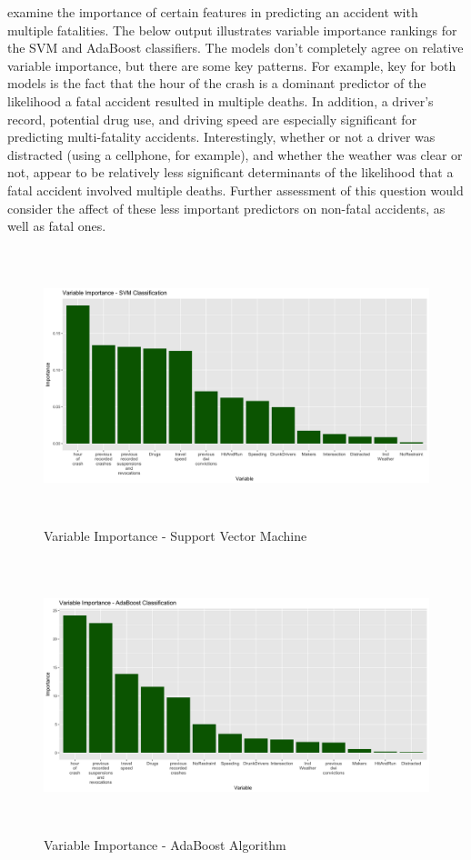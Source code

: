 \documentclass[11pt, oneside,titlepage]{article}   	%
\begin{document}
 examine the importance of certain features in predicting an accident with multiple fatalities. The below output illustrates variable importance rankings for the SVM and AdaBoost classifiers. The models don't completely agree on relative variable importance, but there are some key patterns. For example, key for both models is the fact that the hour of the crash is a dominant predictor of the likelihood a fatal accident resulted in multiple deaths. In addition, a driver's record, potential drug use, and driving speed are especially significant for predicting multi-fatality accidents. Interestingly, whether or not a driver was distracted (using a cellphone, for example), and whether the weather was clear or not, appear to be relatively less significant determinants of the likelihood that a fatal accident involved multiple deaths. Further assessment of this question would consider the affect of these less important predictors on non-fatal accidents, as well as fatal ones. \\

\begin{figure}[H]
\centering
  \includegraphics[width=15cm,height=8cm,keepaspectratio]{ImportancePlot_SVM.png}
\caption{Variable Importance - Support Vector Machine}
\end{figure}

\begin{figure}[H]
\centering
  \includegraphics[width=15cm,height=8cm,keepaspectratio]{ImportancePlot_ADABoost.png}
\caption{Variable Importance - AdaBoost Algorithm}
\end{figure}
\end{document}
